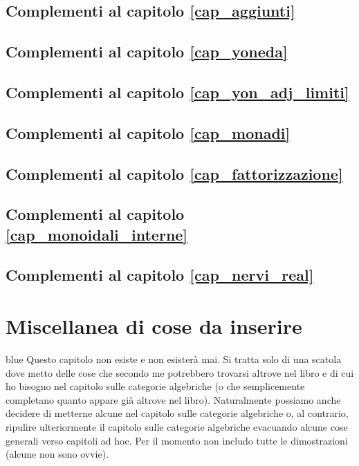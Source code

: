 \section{Complementi al capitolo \ref{cap_aggiunti}}
\section{Complementi al capitolo \ref{cap_yoneda}}
\section{Complementi al capitolo \ref{cap_yon_adj_limiti}}
\section{Complementi al capitolo \ref{cap_monadi}}
\section{Complementi al capitolo \ref{cap_fattorizzazione}}
\section{Complementi al capitolo \ref{cap_monoidali_interne}}
\section{Complementi al capitolo \ref{cap_nervi_real}}


\chapter{Miscellanea di cose da inserire}\label{cap_misc}

\begin{color}{blue}
 Questo capitolo  non esiste e non esisterà mai. Si tratta solo di una scatola dove metto delle cose che secondo me potrebbero
 trovarsi altrove nel libro e di cui ho bisogno nel capitolo sulle categorie algebriche (o che semplicemente completano quanto appare
 già altrove nel libro). Naturalmente possiamo anche decidere di metterne alcune nel capitolo sulle categorie algebriche o, al
 contrario, ripulire ulteriormente il capitolo sulle categorie algebriche evacuando alcune cose generali verso capitoli ad hoc.
 Per il momento non includo tutte le dimostrazioni (alcune non sono ovvie).
\end{color}



